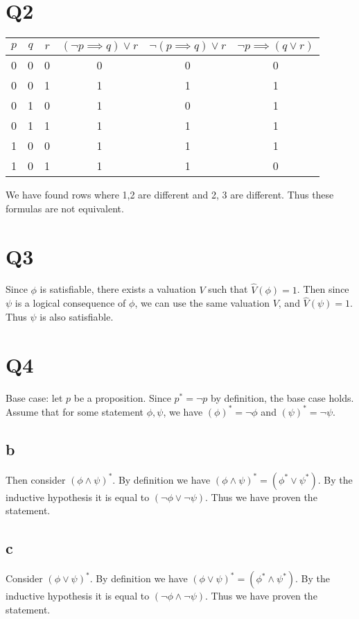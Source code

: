 \documentclass[12pt]{article}
\begin{document}
\section{Q2}
\begin{tabular}{|c | c |c |c |c |c |}
    \hline
    $p$ & $q$ & $r$ & $(\neg p \implies q) \lor r$ & $\neg (p \implies q) \lor r$ & $\neg p \implies (q \lor r)$ \\
    \hline
    0 & 0 & 0 & 0 & 0 & 0 \\
    \hline
    0 & 0 & 1 & 1 & 1 & 1 \\
    \hline
    0 & 1 & 0 & 1 & 0 & 1 \\
    \hline
    0 & 1 & 1 & 1 & 1 & 1 \\
    \hline
    1 & 0 & 0 & 1 & 1 & 1 \\
    \hline
    1 & 0 & 1 & 1 & 1 & 0 \\
    \hline
\end{tabular}
\newline
We have found rows where 1,2 are different and 2, 3 are different. Thus these formulas are not equivalent.

\section{Q3}
Since $\phi$ is satisfiable, there exists a valuation $V$ such that $\hat{V}(\phi)=1$.
Then since $\psi$ is a logical consequence of $\phi$, we can use the same valuation $V$, and $\hat{V}(\psi)=1$. Thus $\psi$ is also satisfiable.

\section{Q4}
Base case: let $p$ be a proposition. Since $p^* = \neg p$ by definition, the base case holds.
\newline
Assume that for some statement $\phi, \psi$, we have $(\phi)^* = \neg \phi$ and $(\psi)^* = \neg \psi$.
\subsection{b}
Then consider $(\phi \land \psi)^*$. By definition we have $(\phi \land \psi)^*=(\phi^* \lor \psi^*)$.
By the inductive hypothesis it is equal to $(\neg \phi \lor \neg \psi)$. Thus we have proven the statement.

\subsection{c}
Consider $(\phi \lor \psi)^*$. By definition we have $(\phi \lor \psi)^*=(\phi^* \land \psi^*)$.
By the inductive hypothesis it is equal to $(\neg \phi \land \neg \psi)$. Thus we have proven the statement.
\end{document}
